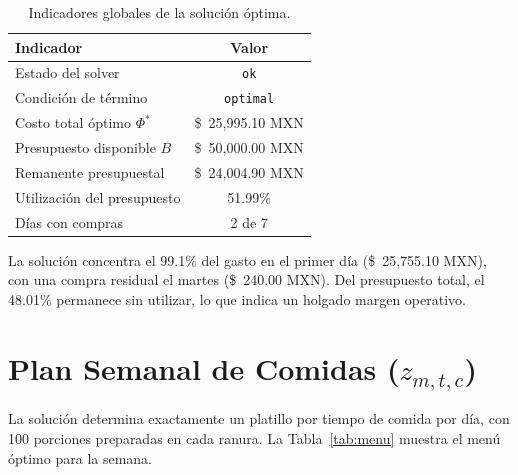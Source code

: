 \documentclass[12pt]{report}
\begin{document}
\begin{table}[H]
\centering
\renewcommand{\arraystretch}{1.3}
\begin{tabular}{lc}
\toprule
\textbf{Indicador} & \textbf{Valor} \\
\midrule
Estado del solver              & \texttt{ok} \\
Condición de término           & \texttt{optimal} \\
Costo total óptimo $\Phi^*$    & \$~25{,}995.10 MXN \\
Presupuesto disponible $B$     & \$~50{,}000.00 MXN \\
Remanente presupuestal         & \$~24{,}004.90 MXN \\
Utilización del presupuesto    & 51.99\% \\
Días con compras               & 2 de 7 \\
\bottomrule
\end{tabular}
\caption{Indicadores globales de la solución óptima.}
\label{tab:resumen}
\end{table}

La solución concentra el 99.1\% del gasto en el primer día (\$~25{,}755.10 MXN),
con una compra residual el martes (\$~240.00 MXN). Del presupuesto total, el
48.01\% permanece sin utilizar, lo que indica un holgado margen operativo.

\section{Plan Semanal de Comidas ($z_{m,t,c}$)}

La solución determina exactamente un platillo por tiempo de comida por día,
con 100 porciones preparadas en cada ranura. La Tabla~\ref{tab:menu} muestra
el menú óptimo para la semana.
\end{document}
